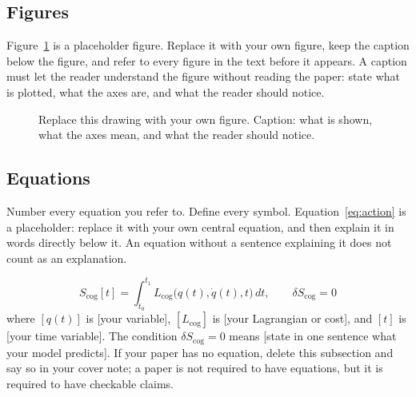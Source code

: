 \documentclass[9pt,a4paper,twocolumn]{article}
\begin{document}
\subsection{Figures}
Figure~\ref{fig:example} is a placeholder figure. Replace it with your own figure, keep the caption below the figure, and refer to every figure in the text before it appears. A caption must let the reader understand the figure without reading the paper: state what is plotted, what the axes are, and what the reader should notice.

\begin{figure}[h]
\centering
{}
\caption{Replace this drawing with your own figure. Caption: what is shown, what the axes mean, and what the reader should notice.}
\label{fig:example}
\end{figure}


\subsection{Equations}
Number every equation you refer to. Define every symbol. Equation~\eqref{eq:action} is a placeholder: replace it with your own central equation, and then explain it in words directly below it. An equation without a sentence explaining it does not count as an explanation.

\begin{equation}
\label{eq:action}
S_{\mathrm{cog}}[t] = \int_{t_0}^{t_1} L_{\mathrm{cog}}\big(q(t), \dot{q}(t), t\big)\, dt,
\qquad \delta S_{\mathrm{cog}} = 0
\end{equation}
where $[q(t)]$ is [your variable], $[L_{\mathrm{cog}}]$ is [your Lagrangian or cost], and $[t]$ is [your time variable]. The condition $\delta S_{\mathrm{cog}} = 0$ means [state in one sentence what your model predicts]. If your paper has no equation, delete this subsection and say so in your cover note; a paper is not required to have equations, but it is required to have checkable claims.
\end{document}
